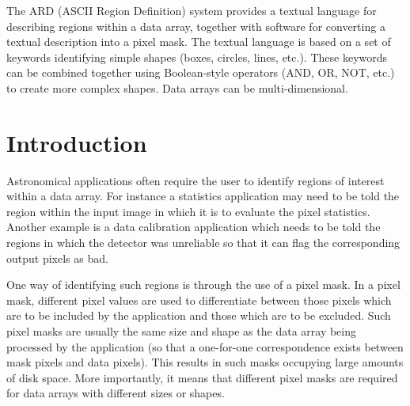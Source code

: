 The ARD (ASCII Region Definition) system provides a textual language for 
describing regions within a data array, together with software for converting
a textual description into a pixel mask. The textual language is based on a 
set of keywords identifying simple shapes (boxes, circles, lines, etc.). These 
keywords can be combined together using Boolean-style operators (AND, OR,
NOT, etc.) to create more complex shapes. Data arrays can be multi-dimensional.
 \newpage
 \begin{latexonly}
   \setlength{\parskip}{0mm}
   \latexonlytoc
   \setlength{\parskip}{\medskipamount}
   \markright{\stardocname}
 \end{latexonly}
\newpage
\renewcommand{\thepage}{\arabic{page}}
\setcounter{page}{1}


\section{Introduction}

Astronomical applications often require the user to identify regions of interest
within a data array. For instance a statistics application may need to be told
the region within the input image in which it is to evaluate the pixel
statistics. Another example is a data calibration application which needs
to be told the regions in which the detector was unreliable so that it can flag
the corresponding output pixels as bad.

One way of identifying such regions is through the use of a pixel mask. In a
pixel mask, different pixel values are used to differentiate between those
pixels which are to be included by the application and those which are to be
excluded. Such pixel masks are usually the same size and shape as the data array
being processed by the application (so that a one-for-one correspondence exists
between mask pixels and data pixels). This results in such masks occupying large
amounts of disk space. More importantly, it means that different pixel masks are
required for data arrays with different sizes or shapes. 

